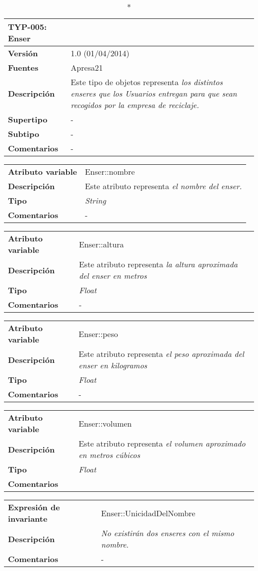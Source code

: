 
\begin{longtable}{p{2.5cm}  p{14cm}}
\caption*{\textbf{TYP-005: Enser}} \\
\hline
\textbf{Versión} & 1.0 (01/04/2014) \\
\textbf{Fuentes} & Apresa21 \\
\textbf{Descripción} & Este tipo de objetos representa  \textit{los distintos enseres que los Usuarios entregan para que sean recogidos por la empresa de reciclaje.} \\
\textbf{Supertipo} & - \\
\textbf{Subtipo} & -  \\
\textbf{Comentarios} &- \\
\end{longtable}

\begin{longtable}{p{3cm}  p{12cm}}
\hline
\textbf{Atributo variable} & Enser::nombre \\
\textbf{Descripción} & Este atributo representa  \textit{el nombre del enser.} \\
\textbf{Tipo} & \textit{String} \\
\textbf{Comentarios} & - \\
\end{longtable}

\begin{longtable}{p{3cm}  p{12cm}}
\hline
\textbf{Atributo variable} & Enser::altura \\
\textbf{Descripción} & Este atributo representa  \textit{la altura aproximada del enser en metros} \\
\textbf{Tipo} & \textit{Float} \\
\textbf{Comentarios} & - \\
\end{longtable}

\begin{longtable}{p{3cm}  p{12cm}}
\hline
\textbf{Atributo variable} & Enser::peso \\
\textbf{Descripción} & Este atributo representa  \textit{el peso aproximada del enser en kilogramos} \\
\textbf{Tipo} & \textit{Float} \\
\textbf{Comentarios} & - \\
\end{longtable}

\begin{longtable}{p{3cm}  p{12cm}}
\hline
\textbf{Atributo variable} & Enser::volumen \\
\textbf{Descripción} & Este atributo representa  \textit{el volumen aproximado en metros cúbicos} \\
\textbf{Tipo} & \textit{Float} \\
\textbf{Comentarios}
\end{longtable}

\begin{longtable}{p{3cm}  p{12cm}}
\hline
\textbf{Expresión de invariante} & Enser::UnicidadDelNombre \\
\textbf{Descripción} &  \textit{No existirán dos enseres con el mismo nombre}.  \\
\textbf{Comentarios} & -\\
\end{longtable}